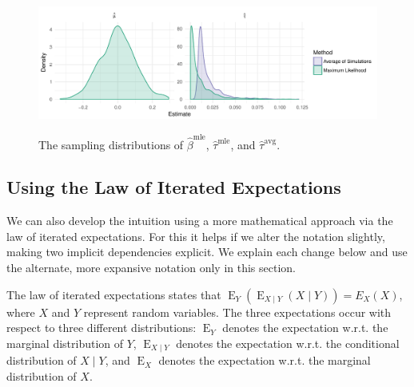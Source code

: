 \documentclass[11pt]{article}
\DeclareMathOperator*{\E}{\text{E}}
\begin{document}
\begin{figure}[h]
\begin{center}
\includegraphics[scale = 0.75]{figs/intuition-sampling.pdf}\\
\vspace{.1in}
\caption{The sampling distributions of $\hat{\beta}^\text{mle}$, $\hat{\tau}^\text{mle}$, and $\hat{\tau}^\text{avg}$.}\label{fig:int-samp}
\end{center}
\end{figure}

\subsection*{Using the Law of Iterated Expectations}

We can also develop the intuition using a more mathematical approach via the law of iterated expectations. For this it helps if we alter the notation slightly, making two implicit dependencies explicit. We explain each change below and use the alternate, more expansive notation only in this section.

The law of iterated expectations states that $\E_Y \left( \E_{X \mid Y}(X \mid Y) \right) = E_X(X)$, where $X$ and $Y$ represent random variables. The three expectations occur with respect to three different distributions: $\E_Y$ denotes the expectation w.r.t. the marginal distribution of $Y$, $\E_{X \mid Y}$ denotes the expectation w.r.t. the conditional distribution of $X \mid Y$, and $\E_X$ denotes the expectation w.r.t. the marginal distribution of $X$.
\end{document}
